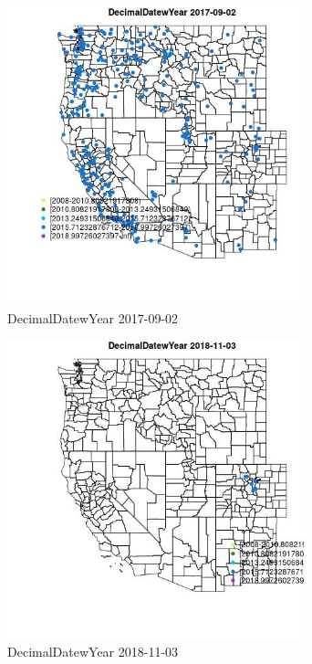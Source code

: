\begin{figure} 
\centering  
\includegraphics[width=0.77\textwidth]{Code_Outputs/Report_ML_input_PM25_Step4_part_e_de_duplicated_aveswNAs_MapObsDecimalDatewYear2017-09-02.jpg} 
\caption{\label{fig:Report_ML_input_PM25_Step4_part_e_de_duplicated_aveswNAsMapObsDecimalDatewYear2017-09-02}DecimalDatewYear 2017-09-02} 
\end{figure} 
 

\begin{figure} 
\centering  
\includegraphics[width=0.77\textwidth]{Code_Outputs/Report_ML_input_PM25_Step4_part_e_de_duplicated_aveswNAs_MapObsDecimalDatewYear2018-11-03.jpg} 
\caption{\label{fig:Report_ML_input_PM25_Step4_part_e_de_duplicated_aveswNAsMapObsDecimalDatewYear2018-11-03}DecimalDatewYear 2018-11-03} 
\end{figure} 
 

